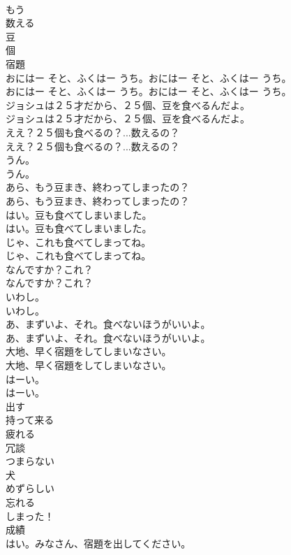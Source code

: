 \documentclass[8pt]{extreport}
\begin{document}
\begin{CJK}{UTF8}{min}
\\	もう
\\	数える
\\	豆
\\	個
\\	宿題
\\	おにはー そと、ふくはー うち。おにはー そと、ふくはー うち。	
\\	おにはー そと、ふくはー うち。おにはー そと、ふくはー うち。 
\\	ジョシュは２５才だから、２５個、豆を食べるんだよ。	
\\	ジョシュは２５才だから、２５個、豆を食べるんだよ。 
\\	ええ？２５個も食べるの？...数えるの？	
\\	ええ？２５個も食べるの？...数えるの？ 
\\	うん。	
\\	うん。 
\\	あら、もう豆まき、終わってしまったの？	
\\	あら、もう豆まき、終わってしまったの？ 
\\	はい。豆も食べてしまいました。	
\\	はい。豆も食べてしまいました。 
\\	じゃ、これも食べてしまってね。	
\\	じゃ、これも食べてしまってね。 
\\	なんですか？これ？	
\\	なんですか？これ？ 
\\	いわし。	
\\	いわし。 
\\	あ、まずいよ、それ。食べないほうがいいよ。	
\\	あ、まずいよ、それ。食べないほうがいいよ。 
\\	大地、早く宿題をしてしまいなさい。	
\\	大地、早く宿題をしてしまいなさい。 
\\	はーい。	
\\	はーい。 
\\	出す
\\	持って来る
\\	疲れる
\\	冗談
\\	つまらない
\\	犬
\\	めずらしい
\\	忘れる
\\	しまった！
\\	成績
\\	はい。みなさん、宿題を出してください。	

\end{CJK}
\end{document}
